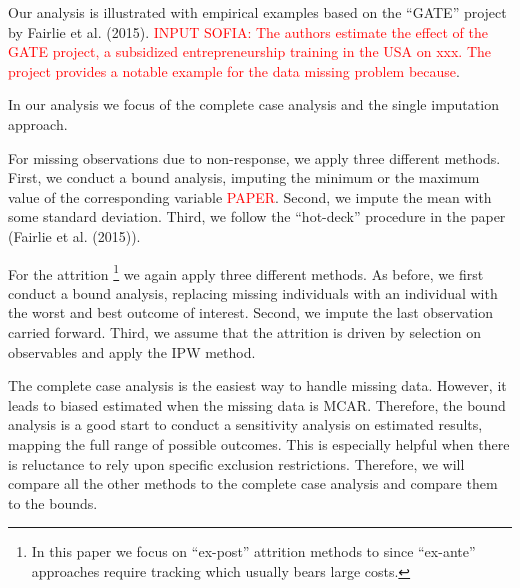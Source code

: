 Our analysis is illustrated with empirical examples based on the ``\ac{GATE}'' project by Fairlie et al. (2015). \textcolor{red}{INPUT SOFIA: The authors estimate the effect of the \ac{GATE} project, a subsidized entrepreneurship training in the USA on xxx. The project provides a notable example for the data missing problem because}.

In our analysis we focus of the complete case analysis and the single imputation approach. 

For missing observations due to non-response, we apply three different methods. First, we conduct a bound analysis, imputing the minimum or the maximum value of the corresponding variable \textcolor{red}{PAPER}. Second, we impute the mean with some standard deviation. 
Third, we follow the ``hot-deck'' procedure in the paper (Fairlie et al. (2015)). 

For the attrition \footnote{In this paper we focus on ``ex-post'' attrition methods to  since ``ex-ante'' approaches require tracking which usually bears large costs.} we again apply three different methods. As before, we first conduct a bound analysis, replacing missing individuals with an individual with the worst and best outcome of interest. Second, we impute the last observation carried forward. Third, we assume that the attrition is driven by selection on observables and apply the \ac{IPW} method. 

The complete case analysis is the easiest way to handle missing data. However, it leads to biased estimated when the missing data is \ac{MCAR}. Therefore, the bound analysis is a good start to conduct a sensitivity analysis on estimated results, mapping the full range of possible outcomes. This is especially helpful when there is reluctance to rely upon speciﬁc exclusion restrictions. Therefore, we will compare all the other methods to the complete case analysis and compare them to the bounds. 
